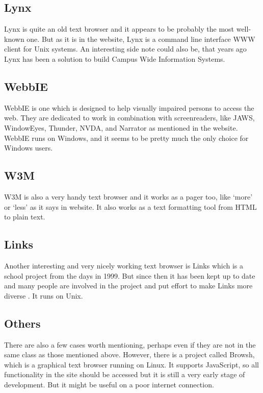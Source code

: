 \subsection{Lynx}%
\label{subsec:tb-lynx}

Lynx is quite an old text browser and it appears to be probably the 
most well-known one. But as it is in the \textcite{lynx} website, Lynx is a
command line interface WWW client for Unix systems. An interesting
side note could also be, that years ago Lynx has been a
solution to build Campus Wide Information Systems.


\subsection{WebbIE}%
\label{subsec:tb-webbie}

WebbIE is one which is designed to help visually impaired persons
to access the web. They are dedicated to work in combination with
screenreaders, like JAWS, WindowEyes, Thunder, NVDA, and Narrator as
mentioned in the \textcite{webbie-main} website. WebbIE runs on
Windows, and it seems to be pretty much the only choice for Windows users.


\subsection{W3M}%
\label{subsec:tb-w3m}

W3M is also a very handy text browser and it works as a pager too, like
`more' or `less' as it says in \textcite{w3m} website. It also works
as a text formatting tool from HTML to plain text.


\subsection{Links}%
\label{subsec:tb-links}

Another interesting and very nicely working text browser is Links
which is a school project from the days in 1999. But since then it has
been kept up to date and many people are involved in the project and
put effort to make Links more diverse \parencite{links}. It runs on
Unix.


\subsection{Others}%
\label{subsec:tb-others}

There are also a few cases worth mentioning, perhaps even if they are not
in the same class as those mentioned above. However, there is a
project called Browsh, which is a graphical text browser running on
Linux. It supports JavaScript, so all functionality in the site should
be accessed but it is still a very early stage of development. But
it might be useful on a poor internet connection.

